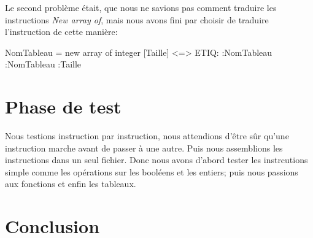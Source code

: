 \documentclass[10pt,a4paper]{article}
\begin{document}
Le second problème était, que nous ne savions pas comment traduire les instructions \textit{New array of}, mais nous avons fini par choisir de traduire l'instruction de cette manière:

NomTableau = new array of integer [Taille] <=> ETIQ:   :NomTableau :NomTableau :Taille



\section{Phase de test}
Nous testions instruction par instruction, nous attendions d'être sûr qu'une instruction marche avant de passer à une autre. Puis nous assemblions les instructions dans un seul fichier. 
Donc nous avons d'abord tester les instrcutions simple comme les opérations sur les booléens et les entiers; puis nous passions aux fonctions et enfin les tableaux.

\newpage
\section{Conclusion}
\end{document}
